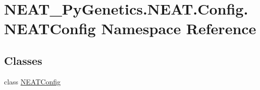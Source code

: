 \hypertarget{namespaceNEAT__PyGenetics_1_1NEAT_1_1Config_1_1NEATConfig}{}\section{N\+E\+A\+T\+\_\+\+Py\+Genetics.\+N\+E\+A\+T.\+Config.\+N\+E\+A\+T\+Config Namespace Reference}
\label{namespaceNEAT__PyGenetics_1_1NEAT_1_1Config_1_1NEATConfig}
\subsection*{Classes}
\begin{DoxyCompactItemize}
\item 
class \hyperlink{classNEAT__PyGenetics_1_1NEAT_1_1Config_1_1NEATConfig_1_1NEATConfig}{N\+E\+A\+T\+Config}
\end{DoxyCompactItemize}
